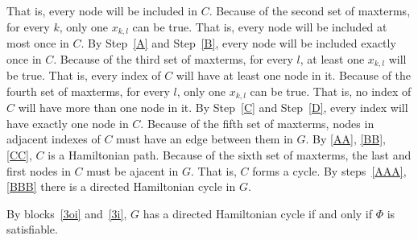 \documentclass[11pt]{article}
\begin{document}
\begin{problems}
\begin{longFormProof}
\begin{block}[3i]
      \step[A] That is, every node will be included in $C$.
      \step Because of the second set of maxterms, for every $k$, only one $x_{k,l}$ can be true.
      \step[B] That is, every node will be included at most once in $C$.
      \step[AA] By Step~\ref{A} and Step~\ref{B}, every node will be included exactly once in $C$.
      \step Because of the third set of maxterms, for every $l$, at least one $x_{k,l}$ will be true.
      \step[C] That is, every index of $C$ will have at least one node in it.
      \step Because of the fourth set of maxterms, for every $l$, only one $x_{k,l}$ can be true.
      \step[D] That is, no index of $C$ will have more than one node in it.
      \step[BB] By Step~\ref{C} and Step~\ref{D}, every index will have exactly one node in $C$.
      \step[CC] Because of the fifth set of maxterms, nodes in adjacent indexes of $C$ must have an edge between them in $G$.
      \step[AAA] By \ref{AA}, \ref{BB}, \ref{CC}, $C$ is a Hamiltonian path.
      \step Because of the sixth set of maxterms, the last and first nodes in $C$ must be ajacent in $G$.
      \step[BBB] That is, $C$ forms a cycle.
      \step By steps~\ref{AAA}, \ref{BBB} there is a directed Hamiltonian cycle in $G$.
    \end{block} 
    \step By blocks~\ref{3oi} and~\ref{3i},
    $G$ has a directed Hamiltonian cycle
    if and only if $\Phi$ is satisfiable.
  \end{longFormProof}


\end{problems}
\end{document}
